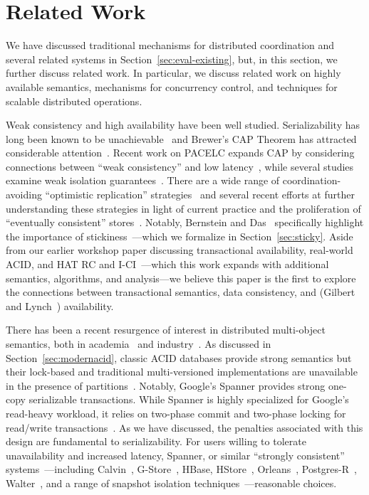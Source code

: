 
\section{Related Work}
\label{sec:relatedwork}

We have discussed traditional mechanisms for distributed
coordination and several related systems in
Section~\ref{sec:eval-existing}, but, in this section, we further discuss
related work. In particular, we discuss related work on highly
available semantics, mechanisms for concurrency control, and
techniques for scalable distributed operations.

Weak consistency and high availability have been well
studied. Serializability has long been known to be
unachievable~\cite{davidson-survey} and Brewer's CAP Theorem has
attracted considerable attention~\cite{gilbert-cap}. Recent work on
PACELC expands CAP by considering connections between ``weak
consistency'' and low latency~\cite{abadi-pacelc}, while several
studies examine weak isolation guarantees~\cite{adya,
  ansicritique}. There are a wide range of coordination-avoiding
``optimistic replication'' strategies~\cite{optimistic} and several
recent efforts at further understanding these strategies in light of
current practice and the proliferation of ``eventually consistent''
stores~\cite{bailis-ec, bernstein-survey}. Notably, Bernstein and
Das~\cite{bernstein-survey} specifically highlight the importance of
stickiness~\cite{sessionguarantees, vogels-defs}---which we formalize
in Section~\ref{sec:sticky}.  Aside from our earlier workshop paper
discussing transactional availability, real-world ACID, and HAT RC and
I-CI~\cite{hat-hotos}---which this work expands with additional
semantics, algorithms, and analysis---we believe this paper is the
first to explore the connections between transactional semantics, data
consistency, and (Gilbert and Lynch~\cite{gilbert-cap}) availability.


There has been a recent resurgence of interest in distributed
multi-object semantics, both in academia~\cite{kraska-s3, gstore,
  eiger, walter,calvin, swift} and industry~\cite{orleans,spanner}. As
discussed in Section~\ref{sec:modernacid}, classic ACID databases
provide strong semantics but their lock-based and traditional
multi-versioned implementations are unavailable in the presence of
partitions~\cite{bernstein-book, gray-isolation}. Notably, Google's
Spanner provides strong one-copy serializable transactions. While
Spanner is highly specialized for Google's read-heavy workload, it
relies on two-phase commit and two-phase locking for read/write
transactions~\cite{spanner}. As we have discussed, the penalties
associated with this design are fundamental to serializability. For
users willing to tolerate unavailability and increased latency,
Spanner, or similar ``strongly consistent''
systems~\cite{kemme-classification}---including Calvin~\cite{calvin},
G-Store~\cite{gstore}, HBase, HStore~\cite{hstore},
Orleans~\cite{orleans}, Postgres-R~\cite{kemme-thesis},
Walter~\cite{walter}, and a range of snapshot isolation
techniques~\cite{daudjee-session}---reasonable
choices.

